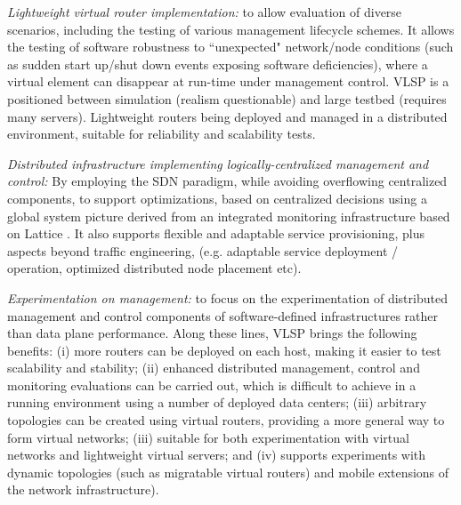 \begin{description}[leftmargin=1.5em,labelindent=0,itemsep=3pt]

\item \textit{Lightweight virtual router implementation:}
to allow evaluation of diverse scenarios, including the
testing of various management lifecycle schemes.
It allows the testing of software 
robustness to ``unexpected" network/node conditions
(such as sudden start up/shut down events exposing software deficiencies),
where a virtual element can disappear at run-time under management control.
VLSP is a
positioned between simulation (realism questionable) and large testbed
(requires many servers).
Lightweight routers being deployed and managed in a distributed environment, suitable for reliability and scalability tests.

\item \textit{Distributed infrastructure implementing logically-centralized management and control:}
By employing the SDN paradigm, while
avoiding overflowing centralized components,
to support optimizations,
based on centralized decisions using a global system picture 
 derived from an integrated monitoring infrastructure based on
Lattice \cite{lattice}.
It also supports flexible and adaptable service provisioning, plus aspects
beyond traffic engineering, 
(e.g. adaptable service deployment /
operation, optimized distributed node placement etc).


\item \textit{Experimentation on management:} 
 to focus on the experimentation of distributed management and
control components of software-defined infrastructures rather
than data plane performance.
Along these lines,
 VLSP brings the following benefits:
 (i) more routers can be deployed
 on each host, making it easier to test scalability and stability;
 (ii) enhanced distributed management, control and monitoring evaluations can be carried out, which is difficult to achieve in a running environment using a number of deployed data centers;
(iii) arbitrary topologies can be created using virtual routers, providing a more general way to form virtual networks; 
(iii) suitable for both experimentation with virtual networks and
lightweight virtual servers; and (iv)  supports experiments with
dynamic topologies (such as migratable virtual routers)
 and mobile extensions of the network infrastructure). 


\end{description}
